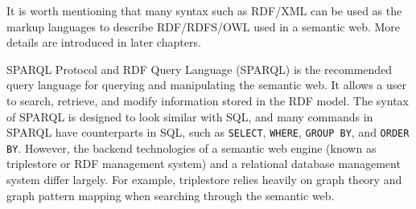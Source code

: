 It is worth mentioning that many syntax such as RDF/XML can be used as the markup languages to describe RDF/RDFS/OWL used in a semantic web. More details are introduced in later chapters.

SPARQL Protocol and RDF Query Language (SPARQL) is the recommended query language for querying and manipulating the semantic web. It allows a user to search, retrieve, and modify information stored in the RDF model. The syntax of SPARQL is designed to look similar with SQL, and many commands in SPARQL have counterparts in SQL, such as \verb|SELECT|, \verb|WHERE|, \verb|GROUP BY|, and \verb|ORDER BY|. However, the backend technologies of a semantic web engine (known as triplestore or RDF management system) and a relational database management system differ largely. For example, triplestore relies heavily on graph theory and graph pattern mapping when searching through the semantic web.

